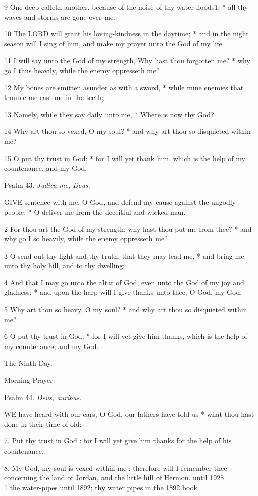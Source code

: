 9
One deep calleth another, because of the noise of thy water-floods1;
* all thy waves and storms are gone over me.

10
The LORD will grant his loving-kindness in the
daytime; * and in the night season will I sing of him, and make my prayer
unto the God of my life.

11
I will say unto the God of my strength, Why hast thou forgotten me? *
why go I thus heavily, while the enemy oppresseth me?

12
My bones are smitten asunder as with a sword, * while mine enemies that
trouble me cast me in the teeth;

13
Namely, while they say daily unto me, * Where is now thy God?

14
Why art thou so vexed, O my soul? * and why art thou so disquieted within
me?

15
O put thy trust in God; * for I will yet thank him, which is the help
of my countenance, and my God.

Psalm
43. \emph{Judica me, Deus.}

GIVE
sentence with me, O God, and defend my cause against the ungodly people;
* O deliver me from the deceitful and wicked man.

2
For thou art the God of my strength; why hast thou put me from thee? *
and why go I so heavily, while the enemy oppresseth me?

3
O send out thy light and thy truth, that they may lead me, * and bring
me unto thy holy hill, and to thy dwelling;

4
And that I may go unto the altar of God, even unto the God of my joy and
gladness; * and upon the harp will I give thanks unto thee, O God, my
God.

5
Why art thou so heavy, O my soul? * and why art thou so disquieted within
me?

6
O put thy trust in God; * for I will yet give him thanks, which is the
help of my countenance, and my God.

The
Ninth Day.

Morning
Prayer.

Psalm
44. \emph{Deus, auribus.}

WE
have heard with our ears, O God, our fathers have told us * what thou
hast done in their time of old:

7. Put thy trust in God :
for I will yet give him thanks for the help of his countenance.

8. My God, my soul is vexed within me : therefore will I remember thee concerning
the land of Jordan, and the little hill of Hermon.
until 1928\\
1 the water-pipes until
1892; thy water pipes in
the 1892 book

